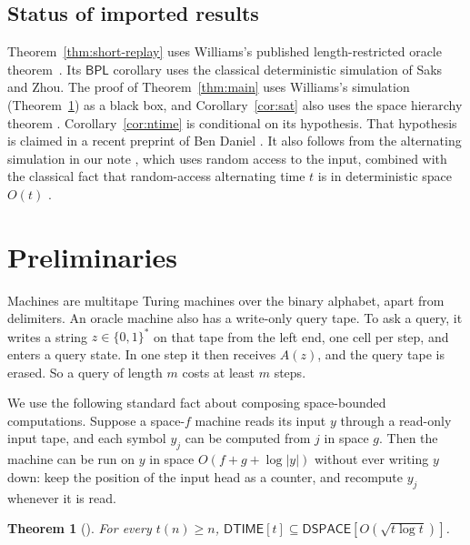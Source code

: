 \documentclass[11pt]{article}
\newtheorem{theorem}{Theorem}[section]
\theoremstyle{remark}
\newcommand{\DTIME}{\mathsf{DTIME}}
\newcommand{\DSPACE}{\mathsf{DSPACE}}
\begin{document}
\subsection{Status of imported results}
Theorem~\ref{thm:short-replay} uses Williams's published length-restricted
oracle theorem~\cite[Theorem~5.1]{Wil25}. Its $\mathsf{BPL}$ corollary
uses the classical deterministic simulation of Saks and Zhou.
The proof of Theorem~\ref{thm:main} uses Williams's simulation
(Theorem~\ref{thm:williams}) as a black box, and Corollary~\ref{cor:sat}
also uses the space hierarchy theorem \cite{SHL}. Corollary~\ref{cor:ntime}
is conditional on its hypothesis. That hypothesis is claimed in a recent
preprint of Ben Daniel \cite{BD26}. It also follows from the alternating
simulation in our note \cite{AS}, which uses random access to the input,
combined with the classical fact that random-access alternating time $t$
is in deterministic space $O(t)$ \cite{CKS}.

\section{Preliminaries}
Machines are multitape Turing machines over the binary alphabet, apart
from delimiters. An oracle machine also has a write-only query tape. To
ask a query, it writes a string $z\in\{0,1\}^*$ on that tape from the left
end, one cell per step, and enters a query state. In one step it then
receives $A(z)$, and the query tape is erased. So a query of length $m$
costs at least $m$ steps.

We use the following standard fact about composing space-bounded
computations. Suppose a space-$f$ machine reads its input $y$ through a
read-only input tape, and each symbol $y_j$ can be computed from $j$ in
space $g$. Then the machine can be run on $y$ in space
$O(f+g+\log|y|)$ without ever writing $y$ down: keep the position of
the input head as a counter, and recompute $y_j$ whenever it is read.

\begin{theorem}[\cite{Wil25}]\label{thm:williams}
For every $t(n)\ge n$, $\DTIME[t]\subseteq\DSPACE[O(\sqrt{t\log t})]$.
\end{theorem}
\end{document}
